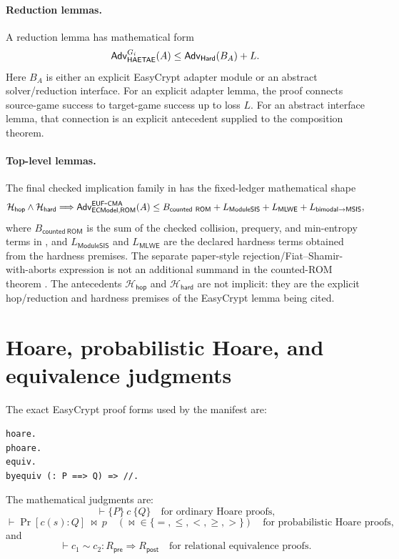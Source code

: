 \paragraph{Reduction lemmas.}
A reduction lemma has mathematical form
\[
  \mathsf{Adv}_{\mathsf{HAETAE}}^{G_i}(A)
  \le
  \mathsf{Adv}_{\mathsf{Hard}}(B_A)+L.
\]
Here \(B_A\) is either an explicit EasyCrypt adapter module or an abstract
solver/reduction interface.  For an explicit adapter lemma, the proof connects
source-game success to target-game success up to loss \(L\).  For an abstract
interface lemma, that connection is an explicit antecedent supplied to the
composition theorem.

\paragraph{Top-level lemmas.}
The final checked implication family in  has the
fixed-ledger mathematical shape
\[
  \mathcal{H}_{\mathsf{hop}}
  \wedge
  \mathcal{H}_{\mathsf{hard}}
  \Longrightarrow
  \mathsf{Adv}_{\mathsf{ECModel},\mathsf{ROM}}^{\mathsf{EUF}\mbox{-}\mathsf{CMA}}(A)
  \le
  B_{\mathsf{counted\ ROM}}
  +
  L_{\mathsf{ModuleSIS}}
  +
  L_{\mathsf{MLWE}}
  +
  L_{\mathsf{bimodal}\to\mathsf{MSIS}},
\]
where \(B_{\mathsf{counted\ ROM}}\) is the sum of the checked collision,
prequery, and min-entropy terms in , and
\(L_{\mathsf{ModuleSIS}}\) and \(L_{\mathsf{MLWE}}\) are the declared hardness
terms obtained from the hardness premises.  The separate
paper-style rejection/Fiat--Shamir-with-aborts expression
 is not an additional summand in the counted-ROM
theorem .  The antecedents
\(\mathcal{H}_{\mathsf{hop}}\) and \(\mathcal{H}_{\mathsf{hard}}\) are not
implicit: they are the explicit hop/reduction and hardness premises of the
EasyCrypt lemma being cited.

\section{Hoare, probabilistic Hoare, and equivalence judgments}
\label{app:semantic-hoare-equiv}

The exact EasyCrypt proof forms used by the manifest are:

\begin{lstlisting}[language=EasyCrypt]
hoare.
phoare.
equiv.
byequiv (: P ==> Q) => //.
\end{lstlisting}

The mathematical judgments are:
\[
  \vdash\{P\}\ c\ \{Q\}
  \quad\text{for ordinary Hoare proofs,}
\]
\[
  \vdash\Pr[c(s):Q]\ \bowtie\ p
  \quad(\bowtie\in\{=,\le,<,\ge,>\})
  \quad\text{for probabilistic Hoare proofs,}
\]
and
\[
  \vdash c_1 \sim c_2 :
  R_{\mathsf{pre}}\Rightarrow R_{\mathsf{post}}
  \quad\text{for relational equivalence proofs.}
\]

